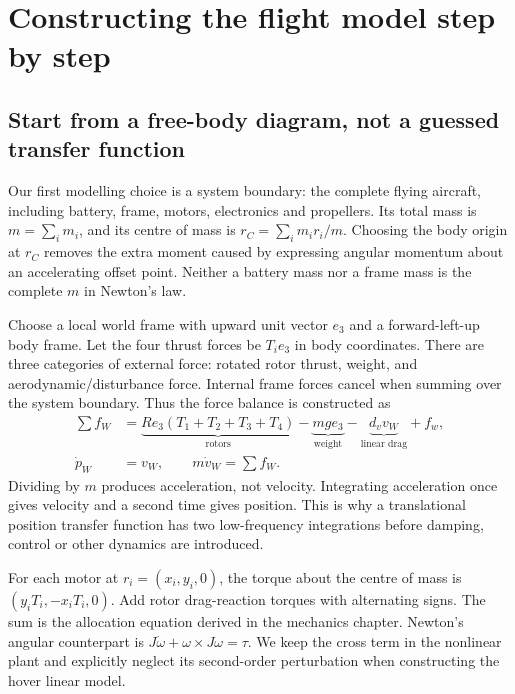 \chapter{Constructing the flight model step by step}
\section{Start from a free-body diagram, not a guessed transfer function}
Our first modelling choice is a system boundary: the complete flying aircraft,
including battery, frame, motors, electronics and propellers. Its total mass is
$m=\sum_i m_i$, and its centre of mass is
$r_C=\sum_i m_i r_i/m$. Choosing the body origin at $r_C$ removes the extra
moment caused by expressing angular momentum about an accelerating offset point.
Neither a battery mass nor a frame mass is the complete $m$ in Newton's law.

Choose a local world frame with upward unit vector $e_3$ and a forward-left-up
body frame. Let the four thrust forces be $T_i e_3$ in body coordinates.
There are three categories of external force: rotated rotor thrust, weight,
and aerodynamic/disturbance force. Internal frame forces cancel when summing
over the system boundary. Thus the force balance is constructed as
\begin{align}
\sum f_W&=\underbrace{R e_3(T_1+T_2+T_3+T_4)}_{\text{rotors}}
 -\underbrace{mg e_3}_{\text{weight}}
 -\underbrace{d_vv_W}_{\text{linear drag}}+f_w,\\
\dot p_W&=v_W,\qquad m\dot v_W=\sum f_W.
\end{align}
Dividing by $m$ produces acceleration, not velocity. Integrating acceleration
once gives velocity and a second time gives position. This is why a translational
position transfer function has two low-frequency integrations before damping,
control or other dynamics are introduced.

For each motor at $r_i=(x_i,y_i,0)$, the torque about the centre of mass is
$(y_iT_i,-x_iT_i,0)$. Add rotor drag-reaction torques with alternating signs.
The sum is the allocation equation derived in the mechanics chapter. Newton's
angular counterpart is $J\dot\omega+\omega\times J\omega=\tau$. We keep the
cross term in the nonlinear plant and explicitly neglect its second-order
perturbation when constructing the hover linear model.

